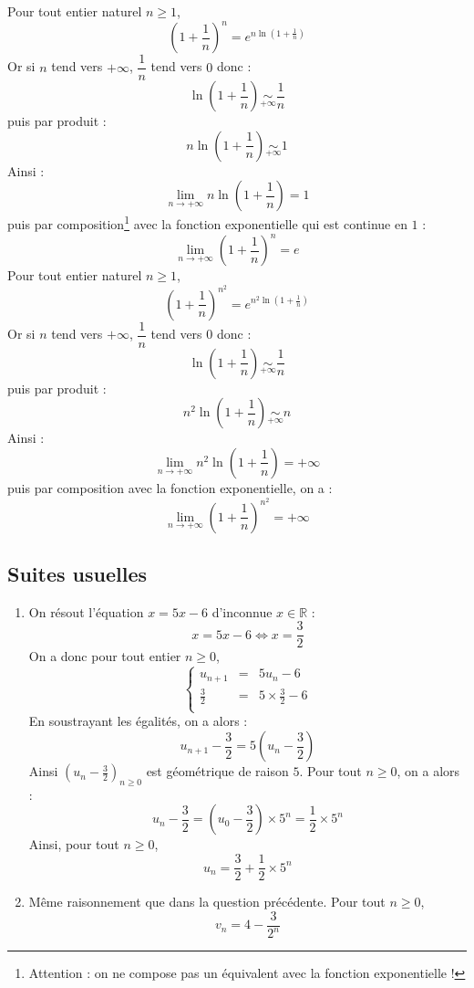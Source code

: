 \documentclass[a4paper,twoside,french,11pt]{VcCours}
\begin{document}
\begin{Exercice}{}\end{Exercice}Pour tout entier naturel $n \geq 1$,
$$ \left( 1 + \frac{1}{n} \right)^n = e^{n \ln \left(1 + \frac{1}{n} \right)}$$
Or si $n$ tend vers $+ \infty$, $\dfrac{1}{n}$ tend vers $0$ donc :
$$  \ln \left(1 + \frac{1}{n} \right) \underset{ + \infty}{\sim} \frac{1}{n}$$
puis par produit :
$$ n \ln \left(1 + \frac{1}{n} \right) \underset{ + \infty}{\sim} 1$$
Ainsi :
$$ \lim_{n \rightarrow + \infty} n \ln \left(1 + \frac{1}{n} \right) = 1$$
puis par composition\footnote{Attention : on ne compose pas un équivalent avec la fonction exponentielle !} avec la fonction exponentielle qui est continue en $1$ : 
$$ \lim_{n \rightarrow + \infty} \left( 1 + \frac{1}{n} \right)^n = e$$
Pour tout entier naturel $n \geq 1$,
$$ \left( 1 + \frac{1}{n} \right)^{n^2} = e^{n^2 \ln \left(1 + \frac{1}{n} \right)}$$
Or si $n$ tend vers $+ \infty$, $\dfrac{1}{n}$ tend vers $0$ donc :
$$  \ln \left(1 + \frac{1}{n} \right) \underset{ + \infty}{\sim} \frac{1}{n}$$
puis par produit :
$$ n^2 \ln \left(1 + \frac{1}{n} \right) \underset{ + \infty}{\sim} n$$
Ainsi :
$$ \lim_{n \rightarrow + \infty} n^2 \ln \left(1 + \frac{1}{n} \right) = + \infty$$
puis par composition avec la fonction exponentielle, on a :
$$ \lim_{n \rightarrow + \infty} \left( 1 + \frac{1}{n} \right)^{n^2} = + \infty$$

\subsection{Suites usuelles}

\begin{Exercice}{}\end{Exercice}

\begin{enumerate}
\item On résout l'équation $x= 5x-6$ d'inconnue $x \in \mathbb{R}$ :
$$ x=5x-6 \Longleftrightarrow x = \frac{3}{2} $$
On a donc pour tout entier $n \geq 0$,
$$ \left\lbrace \begin{array}{ccl}
u_{n+1} & = & 5 u_n - 6 \\
  \frac{3}{2} & = & 5 \times \frac{3}{2} - 6 \\
\end{array}\right. $$
En soustrayant les égalités, on a alors :
$$ u_{n+1} - \frac{3}{2} = 5 \left( u_{n} - \frac{3}{2} \right)$$
Ainsi $\left( u_{n} - \frac{3}{2} \right)_{n \geq 0}$ est géométrique de raison $5$. Pour tout $n \geq 0$, on a alors :
$$  u_{n} - \frac{3}{2} = \left( u_{0} - \frac{3}{2} \right) \times 5^n = \frac{1}{2} \times 5^n $$
Ainsi, pour tout $n \geq 0$,
$$ u_n = \frac{3}{2} + \frac{1}{2} \times 5^n$$
\item Même raisonnement que dans la question précédente. Pour tout $n \geq 0$,
$$ v_n = 4 - \frac{3}{2^n}$$
\end{enumerate}
\end{document}
